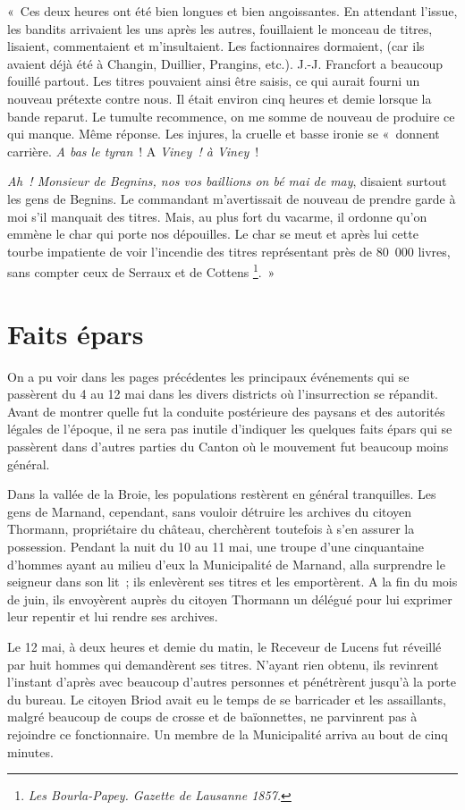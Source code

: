 \documentclass[french,twoside]{book} %
\newenvironment{quoteblock}%
  {\begin{quoting}}
  {\end{quoting}}
\newenvironment{quotebar}{%
    \def\FrameCommand{{\color{rubric!10!}\vrule width 0.5em} \hspace{0.9em}}%
    \def\OuterFrameSep{\itemsep} %
    \MakeFramed {\advance\hsize-\width \FrameRestore}
  }%
  {%
    \endMakeFramed
  }
\renewenvironment{quoteblock}%
  {%
    \savenotes
    \setstretch{0.9}
    \normalfont
    \begin{quotebar}
  }
  {%
    \end{quotebar}
    \spewnotes
  }
\begin{document}
\begin{quoteblock}
 « Ces deux heures ont été bien longues et bien angoissantes. En attendant l’issue, les bandits arrivaient les uns après les autres, fouillaient le monceau de titres, lisaient, commentaient et m’insultaient. Les factionnaires dormaient, (car ils avaient déjà été à Changin, Duillier, Prangins, etc.). J.-J. Francfort a beaucoup fouillé partout. Les titres pouvaient ainsi être saisis, ce qui aurait fourni un nouveau prétexte contre nous. Il était environ cinq heures et demie lorsque la bande reparut. Le tumulte recommence, on me somme de nouveau de produire ce qui manque. Même réponse. Les injures, la cruelle et basse ironie se « donnent carrière. \emph{A bas le tyran} ! A \emph{Viney ! à Viney} !\par
 \emph{Ah ! Monsieur de Begnins, nos vos baillions on bé mai de may}, disaient surtout les gens de Begnins. Le commandant m’avertissait de nouveau de prendre garde à moi s’il manquait des titres. Mais, au plus fort du vacarme, il ordonne qu’on emmène le char qui porte nos dépouilles. Le char se meut et après lui cette tourbe impatiente de voir l’incendie des titres représentant près de 80 000 livres, sans compter ceux de Serraux et de Cottens \footnote{\emph{Les Bourla-Papey. Gazette de Lausanne 1857.}}. »
 \end{quoteblock}

\section[Faits épars]{Faits épars}
\noindent On a pu voir dans les pages précédentes les principaux événements qui se passèrent du 4 au 12 mai dans les divers districts où l’insurrection se répandit. Avant de montrer quelle fut la conduite postérieure des paysans et des autorités légales de l’époque, il ne sera pas inutile d’indiquer les quelques faits épars qui se passèrent dans d’autres parties du Canton où le mouvement fut beaucoup moins général.\par
Dans la vallée de la Broie, les populations restèrent en général tranquilles. Les gens de Marnand, cependant, sans vouloir détruire les archives du citoyen Thormann, propriétaire du château, cherchèrent toutefois à s’en assurer la possession. Pendant la nuit du 10 au 11 mai, une troupe d’une cinquantaine d’hommes ayant au milieu d’eux la Municipalité de Marnand, alla surprendre le seigneur dans son lit ; ils enlevèrent ses titres et les emportèrent. A la fin du mois de juin, ils envoyèrent auprès du citoyen Thormann un délégué pour lui exprimer leur repentir et lui rendre ses archives.\par
Le 12 mai, à deux heures et demie du matin, le Receveur de Lucens fut réveillé par huit hommes qui demandèrent ses titres. N’ayant rien obtenu, ils revinrent l’instant d’après avec beaucoup d’autres personnes et pénétrèrent jusqu’à la porte du bureau. Le citoyen Briod avait eu le temps de se barricader et les assaillants, malgré beaucoup de coups de crosse et de baïonnettes, ne parvinrent pas à rejoindre ce fonctionnaire. Un membre de la Municipalité arriva au bout de cinq minutes.\par
\end{document}

